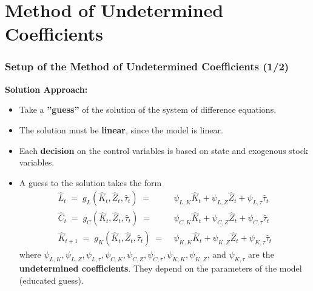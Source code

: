 \documentclass[10pt,c,aspectratio=1610,handout]{beamer}
\begin{document}
\section{Method of Undetermined Coefficients}%
\begin{frame}%
  \frametitle{Setup of the Method of Undetermined Coefficients (1/2)}%
  \textbf{Solution Approach:}%
  \begin{itemize}%
    \item[$\blacktriangleright$] Take a \textbf{''guess''} of the solution of the system of difference equations.%
    \item[$\blacktriangleright$] The solution must be \textbf{linear}, since the model is linear.%
    \item[$\blacktriangleright$] Each \textbf{decision} on the control variables is based on state and exogenous stock variables.%
    \pause%
    \item[$\blacktriangleright$] A guess to the solution takes the form%
      \begin{align}%
        \hat{L}_t \; = \; g_L \left(\hat{K}_t, \hat{Z}_{t}, \hat{\tau}_t\right) \; = & \;  \psi_{L,K} \hat{K}_{t} + \psi_{L,Z} \hat{Z}_{t} + \psi_{L,\tau} \hat{\tau}_{t} \\%
        \hat{C}_t \; = \; g_C \left(\hat{K}_t, \hat{Z}_{t}, \hat{\tau}_t\right) \; = & \; \psi_{C,K} \hat{K}_{t} + \psi_{C,Z} \hat{Z}_{t} + \psi_{C,\tau} \hat{\tau}_{t} \\%
        \hat{K}_{t+1} \; = \; g_K \left(\hat{K}_t, \hat{Z}_{t}, \hat{\tau}_t\right) \; = & \; \psi_{K,K} \hat{K}_{t} + \psi_{K,Z} \hat{Z}_{t} + \psi_{K,\tau} \hat{\tau}_{t}%
      \end{align}%
      where $\psi_{L,K}, \psi_{L,Z}, \psi_{L,\tau}, \psi_{C,K}, \psi_{C,Z}, \psi_{C,\tau}, \psi_{K,K}, \psi_{K,Z}$, and $\psi_{K,\tau}$ are the \textbf{undetermined coefficients}. They depend on the parameters of the model (educated guess).%
  \end{itemize}%
\end{frame}%
\end{document}
